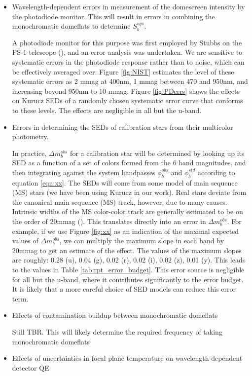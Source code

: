 \documentclass[12pt,preprint]{aastex}
\begin{document}
\begin{itemize}
\item{Wavelength-dependent errors in measurement of the domescreen intensity by the photodiode monitor.  This will result in errors in combining the monochromatic domeflats to determine $S_b^{sys}$.}

A photodiode monitor for this purpose was first employed by Stubbs on the PS-1 telescope (\citep{Stubbs2010a}), and an error analysis
was undertaken.  We are sensitive to systematic errors in the photodiode response rather than to noise, which can be effectively averaged over.  Figure \ref{fig:NIST} estimates the level of these systematic errors as 2 mmag at 400nm, 1 mmag between 470 and 950nm,
and increasing beyond 950nm to 10 mmag.  Figure \ref{fig:PDerrs} shows the effects on Kurucz SEDs of a randomly chosen systematic error curve that conforms to these levels.   The effects are negligible in all but the u-band.

\item{Errors in determining the SEDs of calibration stars from their multicolor photometry.}

In practice, $\Delta m_b^{obs}$ for a calibration star will be determined by looking up its SED as a function of a set of
colors formed from the 6 band magnitudes, and then integrating against the system bandpasses $\phi_b^{obs}$ and $\phi_b^{std}$
according to equation \ref{eqn:xx}.  The SEDs will come from some model of main sequence (MS) stars (we have been using Kurucz in 
our work).  Real stars deviate from the canonical main sequence (MS) track, however, due to many causes.  Intrinsic widths of the MS
color-color track are generally estimated to be on the order of 20mmag (\citep{Zeljko, Covey, High}). This translates directly into an error in $\Delta m_b^{obs}$.  For example, if we use Figure \ref{fig:xx} as an indication of the maximal expected values of 
$\Delta m_b^{obs}$, we can multiply the maximum slope in each band by 20mmag to get an estimate of the effect.  The values of
the maximum slopes are roughly:  0.28 (u), 0.04 (g), 0.02 (r), 0.02 (i), 0.02 (z), 0.01 (y).  This leads to the values
in Table \ref{tab:rpt_error_budget}.  This error source is negligible for all but the u-band, 
where it contributes significantly to the error budget.  It is likely that a more careful choice of SED models can reduce this
error term.

\item{Effects of contamination buildup between monochromatic domeflats}

Still TBR.  This will likely determine the required frequency of taking monochromatic domeflats

\item{Effects of uncertainties in focal plane temperature on wavelength-dependent detector QE}

\end{itemize}
\end{document}
